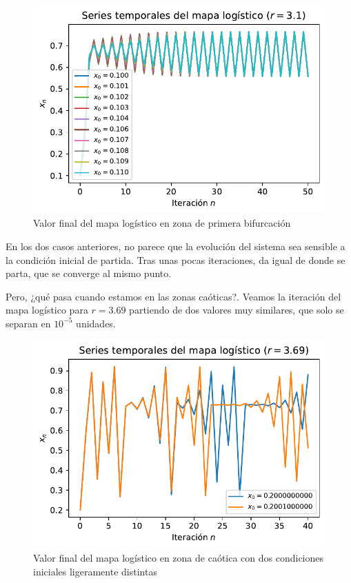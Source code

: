 \documentclass[
  10pt,
  a4paper,
  DIV=11,
  numbers=noendperiod,
  open=any]{scrreprt}
\numberwithin{equation}{chapter}
\numberwithin{equation}{section}
\renewcommand{\[}{\begin{equation}}
\renewcommand{\]}{\end{equation}}
\begin{document}
\begin{figure}[h]
  \centering
  \includegraphics[keepaspectratio]{01-logistica/lyapunov_files/figure-pdf/cell-3-output-1.pdf}
  \caption{Valor final del mapa logístico en zona de primera bifurcación}
\end{figure} 

En los dos casos anteriores, no parece que la evolución del sistema sea
sensible a la condición inicial de partida. Tras unas pocas iteraciones,
da igual de donde se parta, que se converge al mismo punto.

Pero, ¿qué pasa cuando estamos en las zonas caóticas?. Veamos la
iteración del mapa logístico para \(r=3.69\) partiendo de dos valores
muy similares, que solo se separan en \(10^{-5}\) unidades.

\begin{figure}[h]
  \centering
  \includegraphics[keepaspectratio]{01-logistica/lyapunov_files/figure-pdf/cell-4-output-1.pdf}
  \caption{Valor final del mapa logístico en zona de caótica con dos condiciones iniciales ligeramente distintas}
\end{figure} 
\end{document}
